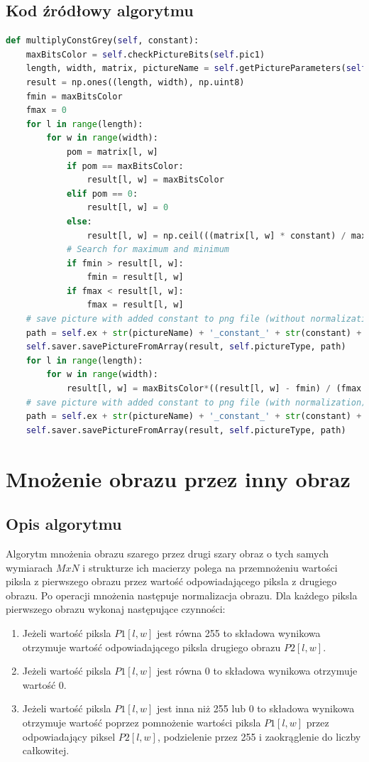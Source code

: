 \documentclass[a4paper,12pt, titlepage]{report}
\begin{document}
\subsection*{Kod źródłowy algorytmu}
\begin{lstlisting}[language=Python]
def multiplyConstGrey(self, constant):
    maxBitsColor = self.checkPictureBits(self.pic1)
    length, width, matrix, pictureName = self.getPictureParameters(self.pic1)
    result = np.ones((length, width), np.uint8)
    fmin = maxBitsColor
    fmax = 0
    for l in range(length):
        for w in range(width):
            pom = matrix[l, w]
            if pom == maxBitsColor:
                result[l, w] = maxBitsColor
            elif pom == 0:
                result[l, w] = 0
            else:
                result[l, w] = np.ceil(((matrix[l, w] * constant) / maxBitsColor))
            # Search for maximum and minimum
            if fmin > result[l, w]:
                fmin = result[l, w]
            if fmax < result[l, w]:
                fmax = result[l, w]
    # save picture with added constant to png file (without normalization)
    path = self.ex + str(pictureName) + '_constant_' + str(constant) + '.png'
    self.saver.savePictureFromArray(result, self.pictureType, path)
    for l in range(length):
        for w in range(width):
            result[l, w] = maxBitsColor*((result[l, w] - fmin) / (fmax - fmin))
    # save picture with added constant to png file (with normalization)
    path = self.ex + str(pictureName) + '_constant_' + str(constant) + '_normalized.png'
    self.saver.savePictureFromArray(result, self.pictureType, path)
\end{lstlisting}

\section{Mnożenie obrazu przez inny obraz}
\subsection*{Opis algorytmu}
\par Algorytm mnożenia obrazu szarego przez drugi szary obraz o tych samych wymiarach \(MxN\) i strukturze ich macierzy polega na przemnożeniu wartości piksla z pierwszego obrazu przez wartość odpowiadającego piksla z drugiego obrazu. Po operacji mnożenia następuje normalizacja obrazu. Dla każdego piksla pierwszego obrazu wykonaj następujące czynności:
\begin{enumerate}
\item Jeżeli wartość piksla \(P1[l,w]\) jest równa 255 to składowa wynikowa otrzymuje wartość odpowiadającego piksla drugiego obrazu \(P2[l,w]\).
\item Jeżeli wartość piksla \(P1[l,w]\) jest równa 0 to składowa wynikowa otrzymuje wartość 0.
\item Jeżeli wartość piksla \(P1[l,w]\) jest inna niż 255 lub 0 to składowa wynikowa otrzymuje wartość poprzez pomnożenie wartości piksla \(P1[l,w]\) przez odpowiadający piksel \(P2[l,w]\), podzielenie przez 255 i zaokrąglenie do liczby całkowitej.
\end{enumerate}
\end{document}

